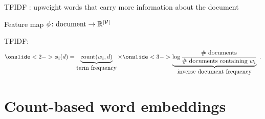 \documentclass[usenames,dvipsnames,notes,11pt,aspectratio=169]{beamer}
\newcommand{\pdfnote}[1]{}
\begin{document}
\begin{frame}
    {TFIDF}
    : upweight words that carry more information about the document
    \pause

    Feature map $\phi\colon \text{document} \rightarrow \mathbb{R}^{|\mathcal{V}|}$

    TFIDF:\\
    $$
    \onslide<2->{
    \phi_i(d) = \underbrace{\text{count}(w_i, d)}_{\textstyle \text{term frequency}} \times 
    }
    \onslide<3->{
    \underbrace{\log \frac{\text{\# documents}}{\textstyle\text{\# documents containing $w_i$}}}_{\textstyle \text{inverse document frequency}}
    \;.
    }
    $$

    \begin{itemize}
    \end{itemize}

\end{frame}

%
%

\section{Count-based word embeddings}
\end{document}
